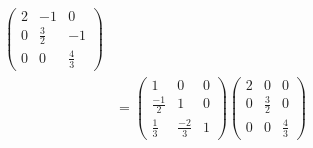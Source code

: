 ﻿\documentclass{book} \usepackage{exsheets} \usepackage{xeCJK}
\begin{document}
\begin{solution}
\begin{align*}
\begin{pmatrix}
                                                                                                                                  2&-1&0\\
                                                                                                                                  0&\frac{3}{2}&-1\\
                                                                                                                                  0&0&\frac{4}{3}
                                                                                                                                \end{pmatrix}\\&=
                                                                                                                                                 \begin{pmatrix}
                                                                                                                                                   1&0&0\\
                                                                                                                                                   \frac{-1}{2}&1&0\\
                                                                                                                                                   \frac{1}{3}&\frac{-2}{3}&1
                                                                                                                                                 \end{pmatrix}
                                                                                                                                                                             \begin{pmatrix}
                                                                                                                                                                               2&0&0\\
                                                                                                                                                                               0&\frac{3}{2}&0\\
                                                                                                                                                                               0&0&\frac{4}{3}
                                                                                                                                                                             \end{pmatrix}

\end{align*}
\end{solution}
\end{document}
